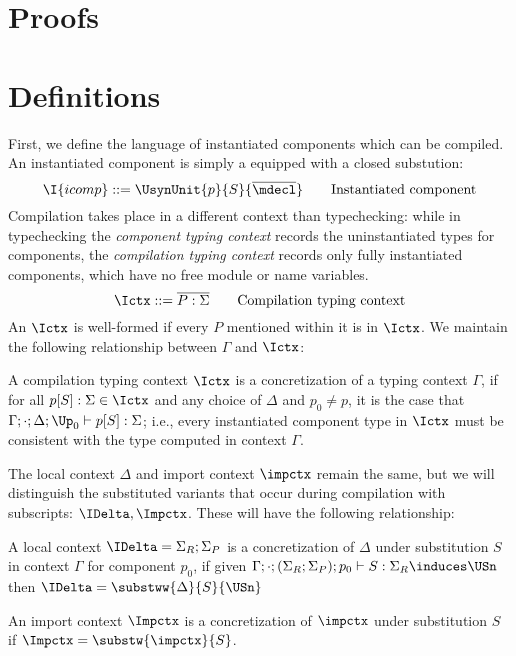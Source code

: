 \section{Proofs}

\section{Definitions}

First, we define the language of instantiated components which can be
compiled.  An instantiated component is simply a \unit{} equipped
with a closed substution:
%
\[
  \I{icomp} ::= \UsynUnit{p}{S}{\overline{\mdecl}} \qquad \text{Instantiated component} \\
\]
%
Compilation takes place in a different context than typechecking:
while in typechecking the \emph{component typing context} records
the uninstantiated types for components, the \emph{compilation typing context}
records only fully instantiated components, which have no free
module or name variables.
%
\[
  \Ictx ::= \overline{P : \Sigma} \qquad \text{Compilation typing context}
\]
%
An $\Ictx$ is well-formed if every $P$ mentioned within it is in $\Ictx$.
We maintain the following relationship between $\Gamma$ and $\Ictx$:

\begin{definition}
A compilation typing context $\Ictx$ is a concretization of a
typing context $\Gamma$, if for all $p[S] : \Sigma \in \Ictx$
and any choice of $\Delta$ and $p_0 \neq p$, it is the case that
$\Gamma; \cdot; \Delta; \Up_0 \vdash p[S] : \Sigma$; i.e., every instantiated component type in $\Ictx$ must be consistent with the type computed in context $\Gamma$.
\end{definition}
%
The local context $\Delta$ and import context $\impctx$ remain the same, but we will distinguish the substituted variants that occur during compilation with
subscripts: $\IDelta, \Impctx$.  These will have the following
relationship:

\begin{definition}
A local context $\IDelta = \Sigma_R; \Sigma_P$ is a concretization of
$\Delta$ under substitution
$S$ in context $\Gamma$ for component $p_0$, if
given $\Gamma; \cdot; (\Sigma_R; \Sigma_P); p_0 \vdash S : \Sigma_R \induces \USn$
then $\IDelta = \substww{\Delta}{S}{\USn}$
\end{definition}

\begin{definition}
An import context $\Impctx$ is a concretization of $\impctx$ under substitution
$S$ if $\Impctx = \substw{\impctx}{S}$.
\end{definition}

